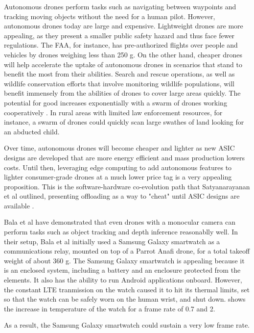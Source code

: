 Autonomous drones perform tasks such as navigating between waypoints and
tracking moving objects without the need for a human pilot.  However,
autonomous drones today are large and expensive. Lightweight drones are more
appealing, as they present a smaller public safety hazard and thus face fewer
regulations. The FAA, for instance, has pre-authorized flights over people and
vehicles by drones weighing less than 250 g. On the other hand, cheaper drones
will help accelerate the uptake of autonomous drones in scenarios that stand to
benefit the most from their abilities. Search and rescue operations, as well as
wildlife conservation efforts that involve monitoring wildlife populations,
will benefit immensely from the abilities of drones to cover large areas
quickly. The potential for good increases exponentially with a swarm of drones
working cooperatively \cite{scherer2015}. In rural areas with limited law
enforcement resources, for instance, a swarm of drones could quickly scan
large swathes of land looking for an abducted child.

Over time, autonomous drones will
become cheaper and lighter as new ASIC designs are developed that are more
energy efficient and mass production lowers costs. Until then, leveraging edge
computing to add autonomous features to lighter consumer-grade drones at a much
lower price tag is a very appealing proposition. This is the software-hardware
co-evolution path that Satyanarayanan et al outlined, presenting offloading as
a way to "cheat" until ASIC designs are available \cite{satya21}.

Bala et al \cite{bala2024} have demonstrated that even drones with a monocular
camera can perform tasks such as object tracking and depth inference
reasonablly well. In their setup, Bala et al initially used a Samsung Galaxy
smartwatch as a communications relay, mounted on top of a Parrot Anafi drone,
for a total takeoff weight of about 360 g. The Samsung Galaxy smartwatch is
appealing because it is an enclosed system, including a battery and an
enclosure protected from the elements. It also has the ability to run Android
applications onboard.  However, the constant LTE tranmission on the watch
caused it to hit its thermal limits, set so that the watch can be safely worn
on the human wrist, and shut down.  shows the
increase in temperature of the watch for a frame rate of 0.7 and 2.

As a result, the Samsung Galaxy smartwatch
could sustain a very low frame rate.

